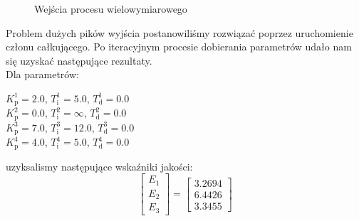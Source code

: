 \begin{figure}
    \begin{subfigure}[b]{\textwidth}
        \centering
    \end{subfigure}
    \caption{Wejścia procesu wielowymiarowego}
    \label{pro_pid_2_in}
\end{figure}
\FloatBarrier

Problem dużych pików wyjścia postanowiliśmy rozwiązać poprzez uruchomienie członu 
całkującego. Po iteracyjnym procesie dobierania parametrów udało nam się uzyskać następujące
rezultaty.\\

Dla parametrów: \\
\begin{center}
    $K^{\num{1}}_{\mathrm{p}} = \num{2.0}$, $T^{\num{1}}_{\mathrm{i}} = \num{5.0}$, $T^{\num{1}}_{\mathrm{d}} = \num{0.0}$ \\
    $K^{\num{2}}_{\mathrm{p}} = \num{0.0}$, $T^{\num{2}}_{\mathrm{i}} = \infty$, $T^{\num{2}}_{\mathrm{d}} = \num{0.0}$ \\
    $K^{\num{3}}_{\mathrm{p}} = \num{7.0}$, $T^{\num{3}}_{\mathrm{i}} = \num{12.0}$, $T^{\num{3}}_{\mathrm{d}} = \num{0.0}$ \\
    $K^{\num{4}}_{\mathrm{p}} = \num{4.0}$, $T^{\num{4}}_{\mathrm{i}} = \num{5.0}$, $T^{\num{4}}_{\mathrm{d}} = \num{0.0}$ \\
\end{center}

uzyksalismy następujące wskaźniki jakości:\\

\[
\begin{bmatrix}
    E_{\mathrm{1}} \\
    E_{\mathrm{2}} \\
    E_{\mathrm{3}} 
\end{bmatrix}
= 
\begin{bmatrix}
    \num{3.2694} \\
    \num{6.4426} \\
    \num{3.3455}
\end{bmatrix}
\]

